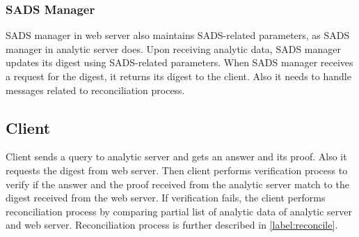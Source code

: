 \subsubsection{SADS Manager}
SADS manager in web server also maintains SADS-related parameters, as SADS manager in analytic server does. 
Upon receiving analytic data, SADS manager updates its digest using SADS-related parameters.
When SADS manager receives a request for the digest, it returns its digest to the client.
Also it needs to handle messages related to reconciliation process.


\subsection{Client}
Client sends a query to analytic server and gets an answer and its proof.
Also it requests the digest from web server.
Then client performs verification process to verify if the answer and the proof received from the analytic server match to the digest received from the web server.
If verification fails, the client performs reconciliation process by comparing partial list of analytic data of analytic server and web server. 
Reconciliation process is further described in \ref{label:reconcile}.
